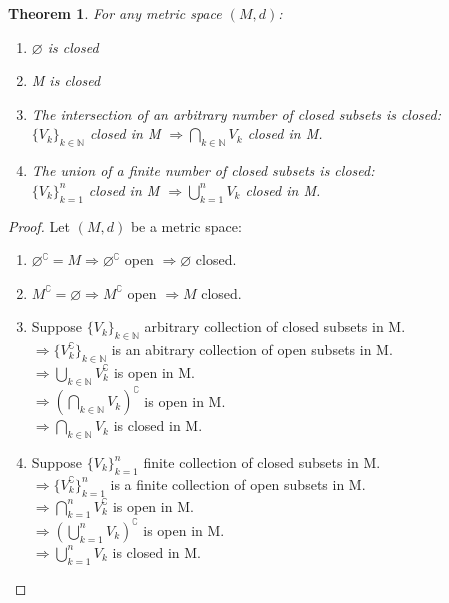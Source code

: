 \documentclass{article}
\newtheorem{theorem}{Theorem}[section]
\begin{document}
			\begin{theorem}
				For any metric space $(M, d)$:
				\begin{enumerate}
					\item $\varnothing$ is closed
					\item M is closed
					\item The intersection of an arbitrary number of closed subsets is closed: \\
					$\{V_{k}\}_{k \in \mathbb{N}}$ closed in M $\Rightarrow \bigcap_{k \in \mathbb{N}} V_{k}$ closed in M. 
					\item The union of a finite number of closed subsets is closed: \\
					$\{V_{k}\}_{k=1}^{n}$ closed in M $\Rightarrow \bigcup_{k=1}^{n} V_{k}$ closed in M.
				\end{enumerate}
			\end{theorem}
			\begin{proof} 
				Let $(M, d)$ be a metric space:
				\begin{enumerate}
					\item $\varnothing^\complement = M \Rightarrow \varnothing^\complement$ open $\Rightarrow\varnothing$ closed.
					\item $M^\complement = \varnothing \Rightarrow M^\complement$ open $\Rightarrow M$ closed.
					\item Suppose $\{V_{k}\}_{k \in \mathbb{N}}$ arbitrary collection of closed subsets in M. \\
					$\Rightarrow \{V_{k}^\complement\}_{k \in \mathbb{N}}$ is an abitrary collection of open subsets in M. \\
					$\Rightarrow \bigcup_{k \in \mathbb{N}} V_{k}^\complement$ is open in M. \\
					$\Rightarrow (\bigcap_{k \in \mathbb{N}} V_{k})^\complement$ is open in M. \\
					$\Rightarrow \bigcap_{k \in \mathbb{N}} V_{k}$ is closed in M. \\
					\item Suppose $\{V_{k}\}_{k=1}^{n}$ finite collection of closed subsets in M. \\
					$\Rightarrow \{V_{k}^\complement\}_{k=1}^{n}$ is a finite collection of open subsets in M. \\
					$\Rightarrow \bigcap_{k=1}^{n} V_{k}^\complement$ is open in M. \\
					$\Rightarrow (\bigcup_{k=1}^{n} V_{k})^\complement$ is open in M. \\
					$\Rightarrow \bigcup_{k=1}^{n} V_{k}$ is closed in M. \\				
				\end{enumerate}
			\end{proof}
\end{document}
